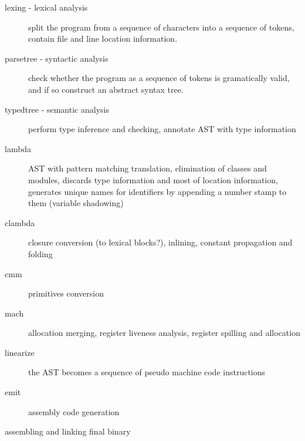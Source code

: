 \begin{description}
    \item[lexing - lexical analysis]
        split the program from a sequence of characters into a sequence of
        tokens, contain file and line location information.

    \item[parsetree - syntactic analysis]
        check whether the program as a sequence of tokens is gramatically valid, and if so
        construct an abstract syntax tree.

    \item[typedtree - semantic analysis]
        perform type inference and checking, annotate AST with type information

    \item[lambda]
        AST with pattern matching translation,
        elimination of classes and modules,
        discards type information and most of location information,
        generates unique names for identifiers by appending a number stamp to them
        (variable shadowing)

    \item[clambda]
        closure conversion (to lexical blocks?), inlining, constant propagation
        and folding

    \item[cmm]
        primitives conversion %

    \item[mach]
        allocation merging, register liveness analysis, register spilling and allocation

    \item[linearize]
        the AST becomes a sequence of pseudo machine code instructions

    \item[emit] assembly code generation

    \item[assembling and linking final binary]
\end{description}

